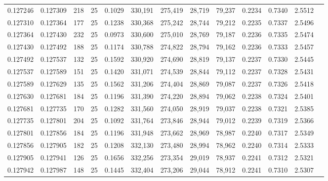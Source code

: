 \begin{tabular}{rrrrrrrrrrrrr}
0.127246 & 0.127309 &   218 &  25 &                                     0.1029 & 330,191 & 275,419 &  28,719 &  79,237 & 0.2234 & 0.7340 & 2.5512 \\
0.127310 & 0.127364 &   177 &  25 &                                     0.1238 & 330,368 & 275,242 &  28,744 &  79,212 & 0.2235 & 0.7337 & 2.5496 \\
0.127364 & 0.127430 &   232 &  25 &                                     0.0973 & 330,600 & 275,010 &  28,769 &  79,187 & 0.2236 & 0.7335 & 2.5474 \\
0.127430 & 0.127492 &   188 &  25 &                                     0.1174 & 330,788 & 274,822 &  28,794 &  79,162 & 0.2236 & 0.7333 & 2.5457 \\
0.127492 & 0.127537 &   132 &  25 &                                     0.1592 & 330,920 & 274,690 &  28,819 &  79,137 & 0.2237 & 0.7330 & 2.5445 \\
0.127537 & 0.127589 &   151 &  25 &                                     0.1420 & 331,071 & 274,539 &  28,844 &  79,112 & 0.2237 & 0.7328 & 2.5431 \\
0.127589 & 0.127629 &   135 &  25 &                                     0.1562 & 331,206 & 274,404 &  28,869 &  79,087 & 0.2237 & 0.7326 & 2.5418 \\
0.127630 & 0.127681 &   184 &  25 &                                     0.1196 & 331,390 & 274,220 &  28,894 &  79,062 & 0.2238 & 0.7324 & 2.5401 \\
0.127681 & 0.127735 &   170 &  25 &                                     0.1282 & 331,560 & 274,050 &  28,919 &  79,037 & 0.2238 & 0.7321 & 2.5385 \\
0.127735 & 0.127801 &   204 &  25 &                                     0.1092 & 331,764 & 273,846 &  28,944 &  79,012 & 0.2239 & 0.7319 & 2.5366 \\
0.127801 & 0.127856 &   184 &  25 &                                     0.1196 & 331,948 & 273,662 &  28,969 &  78,987 & 0.2240 & 0.7317 & 2.5349 \\
0.127856 & 0.127905 &   182 &  25 &                                     0.1208 & 332,130 & 273,480 &  28,994 &  78,962 & 0.2240 & 0.7314 & 2.5333 \\
0.127905 & 0.127941 &   126 &  25 &                                     0.1656 & 332,256 & 273,354 &  29,019 &  78,937 & 0.2241 & 0.7312 & 2.5321 \\
0.127942 & 0.127987 &   148 &  25 &                                     0.1445 & 332,404 & 273,206 &  29,044 &  78,912 & 0.2241 & 0.7310 & 2.5307 \\

\end{tabular}
